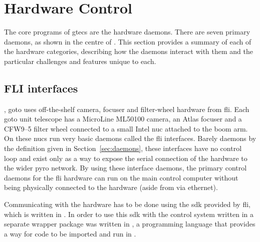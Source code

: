 \section{Hardware Control}
\label{sec:hardware_control}
\begin{colsection}


\begin{colsection}

The core programs of \gls{gtecs} are the hardware daemons. There are seven primary daemons, as shown in the centre of . This section provides a summary of each of the hardware categories, describing how the daemons interact with them and the particular challenges and features unique to each.

\end{colsection}


\subsection{FLI interfaces}
\label{sec:fli}
\begin{colsection}

, \gls{goto} uses off-the-shelf camera, focuser and filter-wheel hardware from \gls{fli}. Each \gls{goto} unit telescope has a MicroLine ML50100 camera, an Atlas focuser and a CFW9--5 filter wheel connected to a small Intel \gls{nuc} attached to the boom arm. On these \glspl{nuc} run very basic daemons called the \gls{fli} interfaces. Barely daemons by the definition given in Section~\ref{sec:daemons}, these interfaces have no control loop and exist only as a way to expose the serial connection of the hardware to the wider \gls{pyro} network. By using these interface daemons, the primary control daemons for the \gls{fli} hardware can run on the main control computer without being physically connected to the hardware (aside from via ethernet).

Communicating with the hardware has to be done using the \gls{sdk} provided by \gls{fli}, which is written in . In order to use this \gls{sdk} with the control system written in  a separate wrapper package  was written in , a programming language that provides a way for  code to be imported and run in .


\end{colsection}
\end{colsection}
